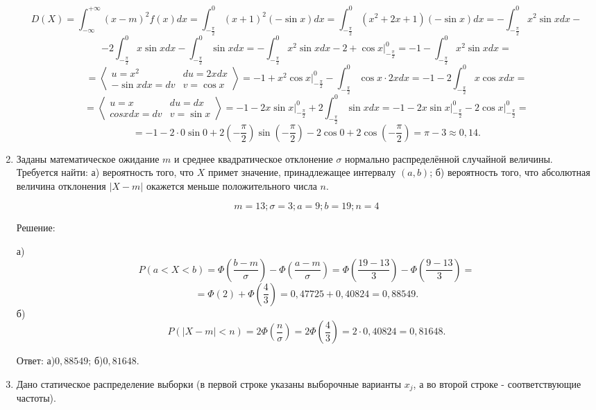 \documentclass{article}
\begin{document}
\begin{enumerate}
$$D(X)=\int_{-\infty}^{+\infty} (x-m)^2 f(x) dx=\int_{-\frac{\pi}{2}}^{0} \left(x+1\right)^2(-\sin{x}) dx
=\int_{-\frac{\pi}{2}}^{0} \left(x^2+2x+1\right)(-\sin{x}) dx=-\int_{-\frac{\pi}{2}}^{0} x^2\sin{x} dx-$$
$$-2\int_{-\frac{\pi}{2}}^{0} x\sin{x} dx-\int_{-\frac{\pi}{2}}^{0} \sin{x} dx=-\int_{-\frac{\pi}{2}}^{0} x^2\sin{x} dx-2+\cos{x}\bigg|_{-\frac{\pi}{2}}^{0}=-1-\int_{-\frac{\pi}{2}}^{0} x^2\sin{x} dx=$$
$$=\left\langle \begin{array}{cc} u=x^2 & du=2xdx \\ -\sin{x}dx=dv & v=\cos{x} \end{array} \right\rangle=-1+x^2\cos{x}\bigg|_{-\frac{\pi}{2}}^{0}-\int_{-\frac{\pi}{2}}^{0}\cos{x}\cdot2xdx=-1-2\int_{-\frac{\pi}{2}}^{0}x\cos{x}dx=$$
$$=\left\langle \begin{array}{cc} u=x & du=dx \\ cos{x}dx=dv & v=\sin{x} \end{array} \right\rangle=-1-2x\sin{x}\bigg|_{-\frac{\pi}{2}}^{0}+2\int_{-\frac{\pi}{2}}^{0}\sin{x}dx=-1-2x\sin{x}\bigg|_{-\frac{\pi}{2}}^{0}-2\cos{x}\bigg|_{-\frac{\pi}{2}}^{0}=$$
$$=-1-2\cdot0\sin{0}+2\left(-\frac{\pi}{2}\right)\sin{\left(-\frac{\pi}{2}\right)}-2\cos{0}+2\cos{\left(-\frac{\pi}{2}\right)}=\pi-3\approx0,14.$$

\item %
Заданы математическое ожидание $m$ и среднее квадратическое отклонение $\sigma$ нормально распределённой случайной величины. \newline
Требуется найти: а) вероятность того, что $X$ примет значение, принадлежащее интервалу $(a, b)$; \newline
б) вероятность того, что абсолютная величина отклонения $|X-m|$ окажется меньше положительного числа $n$.

$$m=13;\sigma=3;a=9;b=19;n=4$$
\begin{center}Решение:\end{center}
а) $$P(a<X<b)=\Phi\left(\frac{b-m}{\sigma}\right)-\Phi\left(\frac{a-m}{\sigma}\right)=\Phi\left(\frac{19-13}{3}\right)-\Phi\left(\frac{9-13}{3}\right)=$$
$$=\Phi(2)+\Phi\left(\frac{4}{3}\right)=0,47725+0,40824=0,88549.$$
б)
$$P (|X-m| < n)= 2\Phi\left(\frac{n}{\sigma}\right)=2\Phi\left(\frac{4}{3}\right)=2\cdot0,40824=0,81648.$$

Ответ: а)$0,88549$; б)$0,81648$.

\item %
Дано статическое распределение выборки (в первой строке указаны выборочные варианты $x_j$, а во второй строке - соответствующие частоты).


\end{enumerate}
\end{document}
